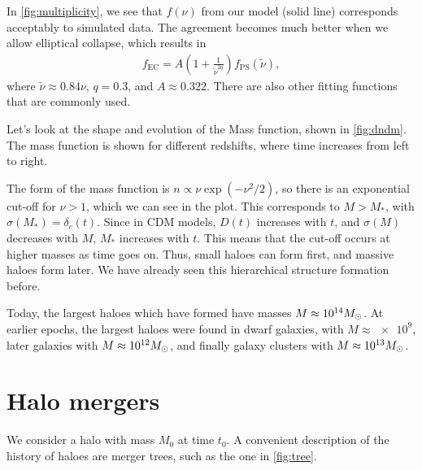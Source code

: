 In \cref{fig:multiplicity}, we see that $f(\nu)$ from our model (solid line) corresponds acceptably to simulated data.
The agreement becomes much better when we allow elliptical collapse, which results in
\begin{align*}
	f_\text{EC}
	= A\left( 1 + \frac{1}{\tilde{\nu}^{2q}} \right) f_\text{PS}(\tilde{\nu}),
\end{align*}
where $\tilde{\nu} \approx 0.84 \nu$, $q = 0.3$, and $A \approx 0.322$.
There are also other fitting functions that are commonly used.


Let's look at the shape and evolution of the Mass function, shown in \cref{fig:dndm}.
The mass function is shown for different redshifts, where time increases from left to right.

The form of the mass function is $n \propto \nu \exp(-\nu^2/2)$, 
so there is an exponential cut-off for $\nu > 1$,
which we can see in the plot.
This corresponds to $M > M_*$, with $\sigma(M_*) = \delta_c(t)$.
Since in CDM models, $D(t)$ increases with $t$, and $\sigma(M)$ decreases with $M$,
$M_*$ increases with $t$.
This means that the cut-off occurs at higher masses as time goes on.
Thus, small haloes can form first, and massive haloes form later.
We have already seen this hierarchical structure formation before.


Today, the largest haloes which have formed have masses $M \approx \num{e14} M_\odot$.
At earlier epochs, the largest haloes were found in dwarf galaxies, with $M \approx \num{e9}$,
later galaxies with $M \approx \num{e12} M_\odot$,
and finally galaxy clusters with  $M \approx \num{e13} M_\odot$.




\section{Halo mergers}

We consider a halo with mass $M_0$ at time $t_0$.
A convenient description of the history of haloes are merger trees, such as the one in \cref{fig:tree}.

